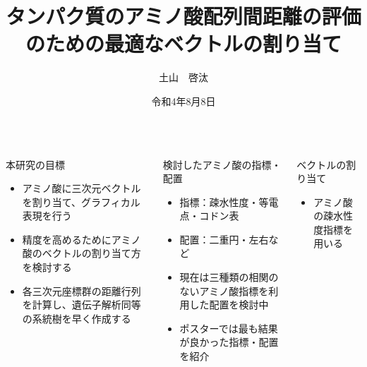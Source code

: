 \documentclass[uplatex,dvipdfmx]{beamer}
\title{\huge タンパク質のアミノ酸配列間距離の評価のための最適なベクトルの割り当て}
\author{土山　啓汰}
\institute{理工学研究科理工学専攻電子情報工学コース1年}
\date{令和4年8月8日}
\begin{document}
\begin{frame}[t]

  \begin{columns}[T,onlytextwidth]
    \column{.48\paperwidth} %

    \begin{block}{本研究の目標}

      \begin{itemize}
      \item {アミノ酸に三次元ベクトルを割り当て、グラフィカル表現を行う}
      \item {精度を高めるためにアミノ酸のベクトルの割り当て方を検討する}
      \item {各三次元座標群の距離行列を計算し、遺伝子解析同等の系統樹を早く作成する}
      \end{itemize}

    \end{block}




    \begin{block}{検討したアミノ酸の指標・配置}
      
      \begin{itemize}
        \item {指標：疎水性度・等電点・コドン表}
        \item {配置：二重円・左右など}
        \item {現在は三種類の相関のないアミノ酸指標を利用した配置を検討中}
        \item {ポスターでは最も結果が良かった指標・配置を紹介}
      \end{itemize}

    \end{block}

    \begin{block}{ベクトルの割り当て}

      \begin{itemize}
      \item {アミノ酸の疎水性度指標を用いる}
      \end{itemize}


\end{block}
\end{columns}
\end{frame}
\end{document}
